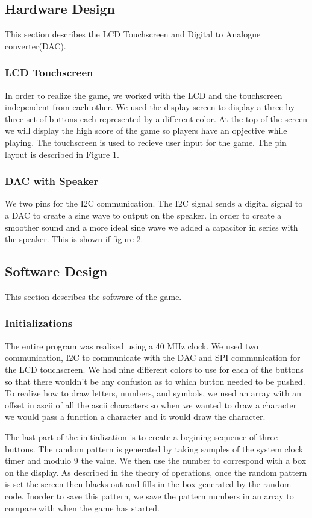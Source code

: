 \documentclass[draft]{article}
\begin{document}
\subsection{Hardware Design}
This section describes the LCD Touchscreen and Digital to Analogue converter(DAC).
\subsubsection{LCD Touchscreen}
In order to realize the game, we worked with the LCD and the touchscreen independent from each other.  We used the display screen to display a three by three set of buttons each represented by a different color.  At the top of the screen we will display the high score of the game so players have an opjective while playing.  The touchscreen is used to recieve user input for the game.  The pin layout is described in Figure 1.

\subsubsection{DAC with Speaker}
We two pins for the I2C communication.  The I2C signal sends a digital signal to a DAC to create a sine wave to output on the speaker.  In order to create a smoother sound and a more ideal sine wave we added a capacitor in series with the speaker.  This is shown if figure 2.

\subsection{Software Design}
This section describes the software of the game.  
\subsubsection{Initializations}
The entire program was realized using a 40 MHz clock.  We used two communication, I2C to communicate with the DAC and SPI communication for the LCD touchscreen.  We had nine different colors to use for each of the buttons so that there wouldn't be any confusion as to which button needed to be pushed.  To realize how to draw letters, numbers, and symbols, we used an array with an offset in ascii of all the ascii characters so when we wanted to draw a character we would pass a function a character and it would draw the character.  
\par\noindent
The last part of the initialization is to create a begining sequence of three buttons.  The random pattern is generated by taking samples of the system clock timer and modulo 9 the value.  We then use the number to correspond with a box on the display.  As described in the theory of operations, once the random pattern is set the screen then blacks out and fills in the box generated by the random code.  Inorder to save this pattern, we save the pattern numbers in an array to compare with when the game has started.  
\end{document}
